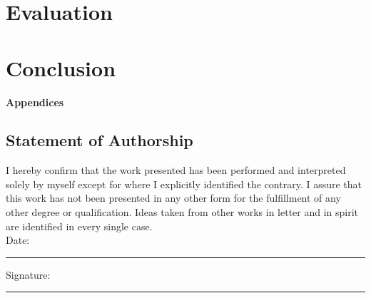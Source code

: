 \documentclass[a4paper,12pt]{report}
\begin{document}
\chapter{Evaluation}

\chapter{Conclusion}


\newpage
\appendix
{}

\begin{center}
\vspace*{5cm}
{\Huge \textbf{Appendices}}
\end{center}
\newpage



\newpage
\renewcommand{\bibname}{References}
\renewcommand{\thechapter}{R}


\renewcommand{\thechapter}{\arabic{chapter}} %

\newpage
\section*{Statement of Authorship}

I hereby confirm that the work presented has been performed and interpreted solely by myself except for where I explicitly identified the contrary. I assure that this work has not been presented in any other form for the fulfillment of any other degree or qualification. Ideas taken from other works in letter and in spirit are identified in every single case.\\[2cm]

\noindent Date: \rule{4cm}{0.5pt} \hfill Signature: \rule{6cm}{0.5pt}
\end{document}
